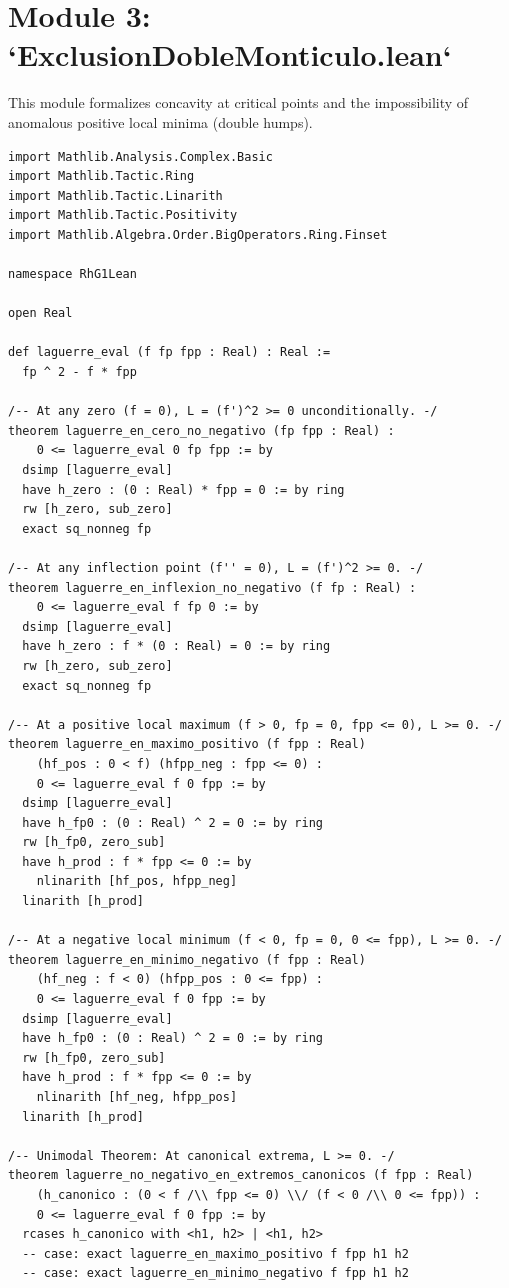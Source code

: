 \documentclass[11pt,a4paper]{article}
\theoremstyle{definition}
\theoremstyle{remark}
\begin{document}
\section{Module 3: `ExclusionDobleMonticulo.lean`}

This module formalizes concavity at critical points and the impossibility of anomalous positive local minima (double humps).

\begin{lstlisting}[language=Lean4]
import Mathlib.Analysis.Complex.Basic
import Mathlib.Tactic.Ring
import Mathlib.Tactic.Linarith
import Mathlib.Tactic.Positivity
import Mathlib.Algebra.Order.BigOperators.Ring.Finset

namespace RhG1Lean

open Real

def laguerre_eval (f fp fpp : Real) : Real :=
  fp ^ 2 - f * fpp

/-- At any zero (f = 0), L = (f')^2 >= 0 unconditionally. -/
theorem laguerre_en_cero_no_negativo (fp fpp : Real) :
    0 <= laguerre_eval 0 fp fpp := by
  dsimp [laguerre_eval]
  have h_zero : (0 : Real) * fpp = 0 := by ring
  rw [h_zero, sub_zero]
  exact sq_nonneg fp

/-- At any inflection point (f'' = 0), L = (f')^2 >= 0. -/
theorem laguerre_en_inflexion_no_negativo (f fp : Real) :
    0 <= laguerre_eval f fp 0 := by
  dsimp [laguerre_eval]
  have h_zero : f * (0 : Real) = 0 := by ring
  rw [h_zero, sub_zero]
  exact sq_nonneg fp

/-- At a positive local maximum (f > 0, fp = 0, fpp <= 0), L >= 0. -/
theorem laguerre_en_maximo_positivo (f fpp : Real)
    (hf_pos : 0 < f) (hfpp_neg : fpp <= 0) :
    0 <= laguerre_eval f 0 fpp := by
  dsimp [laguerre_eval]
  have h_fp0 : (0 : Real) ^ 2 = 0 := by ring
  rw [h_fp0, zero_sub]
  have h_prod : f * fpp <= 0 := by
    nlinarith [hf_pos, hfpp_neg]
  linarith [h_prod]

/-- At a negative local minimum (f < 0, fp = 0, 0 <= fpp), L >= 0. -/
theorem laguerre_en_minimo_negativo (f fpp : Real)
    (hf_neg : f < 0) (hfpp_pos : 0 <= fpp) :
    0 <= laguerre_eval f 0 fpp := by
  dsimp [laguerre_eval]
  have h_fp0 : (0 : Real) ^ 2 = 0 := by ring
  rw [h_fp0, zero_sub]
  have h_prod : f * fpp <= 0 := by
    nlinarith [hf_neg, hfpp_pos]
  linarith [h_prod]

/-- Unimodal Theorem: At canonical extrema, L >= 0. -/
theorem laguerre_no_negativo_en_extremos_canonicos (f fpp : Real)
    (h_canonico : (0 < f /\\ fpp <= 0) \\/ (f < 0 /\\ 0 <= fpp)) :
    0 <= laguerre_eval f 0 fpp := by
  rcases h_canonico with <h1, h2> | <h1, h2>
  -- case: exact laguerre_en_maximo_positivo f fpp h1 h2
  -- case: exact laguerre_en_minimo_negativo f fpp h1 h2


\end{lstlisting}
\end{document}
